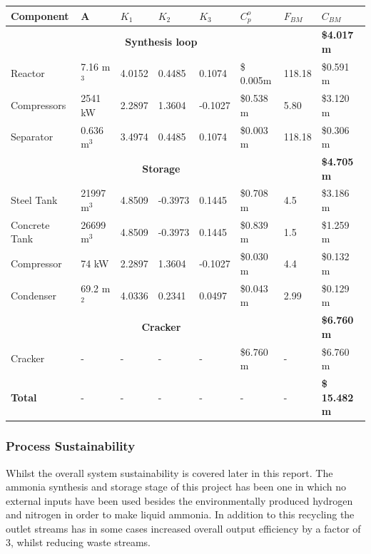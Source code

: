 \documentclass[11pt, a4paper]{article}
\begin{document}
{\begin{table}[!htbp]
\begin{center}
		\begin{tabular}{|l|l|l|l|l|l|l|l|}
			\hline
			Component& A & $K_1$   &$K_2$   &$K_3$   & $C_p^o$  & $F_{BM}$ & $C_{BM}$ \\ \hline
			\multicolumn{7}{|c|}{\textbf{Synthesis loop} }& \textbf{\$4.017 m} \\
			\hline
			Reactor                           & 7.16 m$^3$                & 4.0152 & 0.4485     & 0.1074 & \$ 0.005m & 118.18&   \$0.591 m                 \\ \hline 
			Compressors                             & 2541 kW        & 2.2897 & 1.3604         & -0.1027 & \$0.538 m & 5.80 &  \$3.120 m                  \\ \hline 
			Separator                              & 0.636 m$^3$                & 3.4974 & 0.4485         & 0.1074 & \$0.003 m & 118.18 &  \$0.306 m                  \\ \hline 
			\multicolumn{7}{|c|}{\textbf{Storage} } & \textbf{\$4.705 m} \\
			\hline
			Steel Tank                          & 21997 	m$^3$                & 4.8509 & -0.3973         & 0.1445 & \$0.708 m &4.5 &  \$3.186 m              \\ \hline 
			Concrete Tank                          & 26699 m$^3$                & 4.8509 & -0.3973         & 0.1445 & \$0.839 m &1.5 &  \$1.259 m              \\ \hline 
			Compressor                          & 74 kW                & 2.2897 & 1.3604        & -0.1027 & \$0.030 m &4.4 &  \$0.132 m              \\ \hline 
			Condenser                       & 69.2 m$^2$                & 4.0336 & 0.2341         & 0.0497 & \$0.043 m &2.99 &  \$0.129 m              \\ \hline 	
			\multicolumn{7}{|c|}{\textbf{Cracker} } & \textbf{\$6.760 m} \\
			\hline
			Cracker                             & -                & - & -        & - & \$6.760 m & -&     \$6.760 m               \\ \hline 
			\textbf{Total}& - & - &  -   & - &-  & - &  \textbf{\$ 15.482 m} \\ \hline
			
		\end{tabular}
	
	\end{center}
\end{table}
 
\subsubsection{Process Sustainability}
Whilst the overall system sustainability is covered later in this report. The ammonia synthesis and storage stage of this project has been one in which no external inputs have been used besides the environmentally produced hydrogen and nitrogen in order to make liquid ammonia. In addition to this recycling the outlet streams has in some cases increased overall output efficiency by a factor of 3, whilst reducing waste streams.


}
\end{document}
